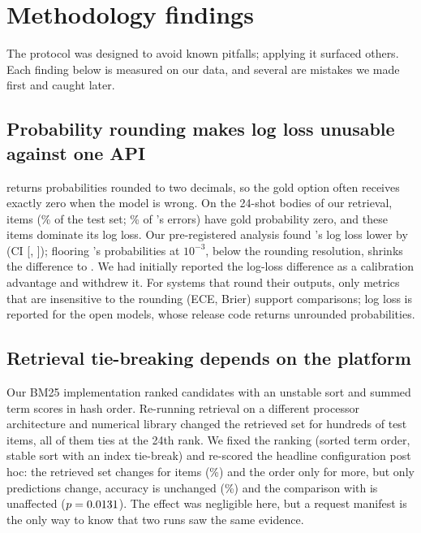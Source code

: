\section{Methodology findings}
\label{sec:findings}

The protocol was designed to avoid known pitfalls; applying it surfaced others. Each finding below is measured on
our data, and several are mistakes we made first and caught later.

\subsection{Probability rounding makes log loss unusable against one API}
\label{sec:find-rounding}
\jev{} returns probabilities rounded to two decimals, so the gold option often receives exactly zero when the model
is wrong. On the 24-shot bodies of our retrieval, \fsJevBGoldZero{} items (\fsJevBGoldZeroPct\% of the test set;
\fsJevBGoldZeroOfErrors\% of \jev's errors) have gold probability zero, and these items dominate its log loss. Our
pre-registered analysis found \orb's log loss lower by \fsSwapDiffLogLoss{} (CI [\fsSwapDiffLogLossLo,
\fsSwapDiffLogLossHi]); flooring \jev's probabilities at $10^{-3}$, below the rounding resolution, shrinks the
difference to \fsSwapDiffLogLossFloor. We had initially reported the log-loss difference as a calibration advantage
and withdrew it. For systems that round their outputs, only metrics that are insensitive to the rounding (ECE,
Brier) support comparisons; log loss is reported for the open models, whose release code returns unrounded
probabilities.

\subsection{Retrieval tie-breaking depends on the platform}
\label{sec:find-ties}
Our BM25 implementation ranked candidates with an unstable sort and summed term scores in hash order. Re-running
retrieval on a different processor architecture and numerical library changed the retrieved set for hundreds of
test items, all of them ties at the 24th rank. We fixed the ranking (sorted term order, stable sort with an index
tie-break) and re-scored the headline configuration post hoc: the retrieved set changes for \fsStableSetDiff{} items
(\fsStableSetDiffPct\%) and the order only for \fsStableOrderOnlyDiff{} more, but only \fsStableChanged{} predictions
change, accuracy is unchanged (\fsStableAcc\%) and the comparison with \jev{} is unaffected ($p=0.0131$).
The effect was negligible here, but a request manifest is the only way to know that two runs saw the same evidence.


